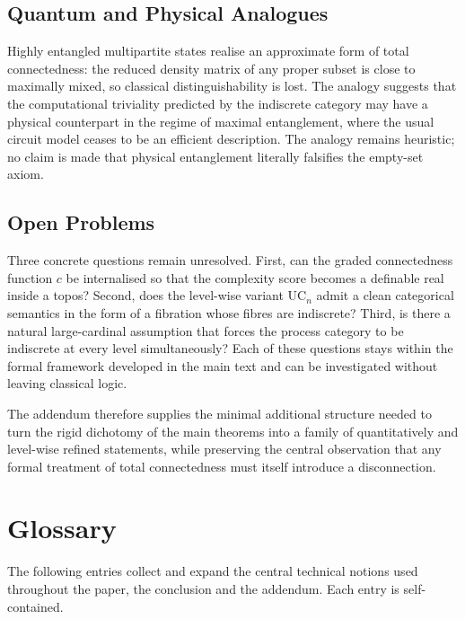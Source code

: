 \documentclass[11pt,a4paper]{article}
\theoremstyle{definition}
\begin{document}
\subsection{Quantum and Physical Analogues}

Highly entangled multipartite states realise an approximate form of total connectedness: the reduced density matrix of any proper subset is close to maximally mixed, so classical distinguishability is lost. The analogy suggests that the computational triviality predicted by the indiscrete category may have a physical counterpart in the regime of maximal entanglement, where the usual circuit model ceases to be an efficient description. The analogy remains heuristic; no claim is made that physical entanglement literally falsifies the empty-set axiom.

\subsection{Open Problems}

Three concrete questions remain unresolved. First, can the graded connectedness function \(c\) be internalised so that the complexity score becomes a definable real inside a topos? Second, does the level-wise variant \(\mathrm{UC}_n\) admit a clean categorical semantics in the form of a fibration whose fibres are indiscrete? Third, is there a natural large-cardinal assumption that forces the process category to be indiscrete at every level simultaneously? Each of these questions stays within the formal framework developed in the main text and can be investigated without leaving classical logic.

The addendum therefore supplies the minimal additional structure needed to turn the rigid dichotomy of the main theorems into a family of quantitatively and level-wise refined statements, while preserving the central observation that any formal treatment of total connectedness must itself introduce a disconnection.

\section*{Glossary}

The following entries collect and expand the central technical notions used throughout the paper, the conclusion and the addendum. Each entry is self-contained.
\end{document}
